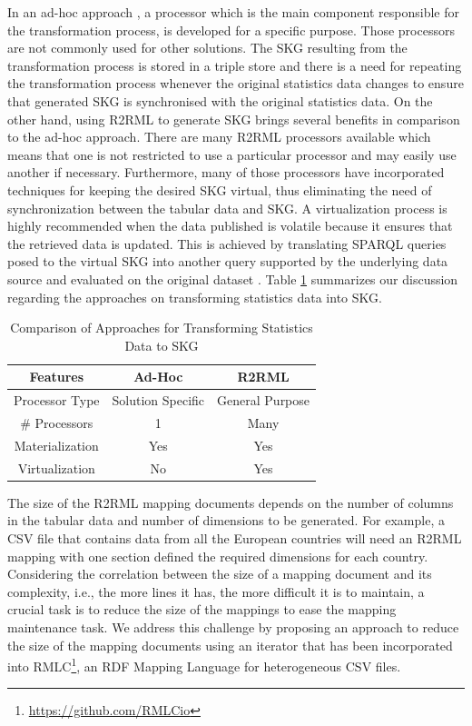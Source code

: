In an ad-hoc approach \citep{corcho2017publishing}, a processor which is the main component responsible for the transformation process, is developed for a specific purpose. Those processors are not commonly used for other solutions. The SKG resulting from the transformation process is stored in a triple store and there is a need for repeating the transformation process whenever the original statistics data changes to ensure that generated SKG is synchronised with the original statistics data. On the other hand, using R2RML to generate SKG brings several benefits in comparison to the ad-hoc approach. There are many R2RML processors \citep{priyatna2014formalisation,calvanese2017ontop} available which means that one is not restricted to use a particular processor and may easily use another if necessary. Furthermore, many of those processors have incorporated techniques for keeping the desired SKG virtual, thus eliminating the need of synchronization between the tabular data and SKG. A virtualization process is highly recommended when the data published is volatile because it ensures that the retrieved data is updated. This is achieved by translating SPARQL queries posed to the virtual SKG into another query supported by the underlying data source and evaluated on the original dataset \citep{poggi2008linking}. Table \ref{table:compare} summarizes our discussion regarding the approaches on transforming statistics data into SKG.

\begin{table}[tbp]
\caption{Comparison of Approaches for Transforming Statistics Data to SKG}
\label{table:compare}
\begin{tabular}{c|c|c}
\hline
\textbf{Features} & \textbf{Ad-Hoc}   & \textbf{R2RML}  \\ \hline
Processor Type    & Solution Specific & General Purpose \\ 
\# Processors     & 1                 & Many            \\
Materialization   & Yes               & Yes             \\ 
Virtualization    & No                & Yes             \\ \hline
\end{tabular}
\end{table}

The size of the R2RML mapping documents depends on the number of columns in the tabular data and number of dimensions to be generated. For example, a CSV file that contains data from all the European countries will need an R2RML mapping with one section defined the required dimensions for each country. Considering the correlation between the size of a mapping document and its complexity, i.e., the more lines it has, the more difficult it is to maintain, a crucial task is to reduce the size of the mappings to ease the mapping maintenance task. We address this challenge by proposing an approach to reduce the size of the mapping documents using an iterator that has been incorporated into RMLC\footnote{\url{https://github.com/RMLCio}}, an RDF Mapping Language for heterogeneous CSV files.

